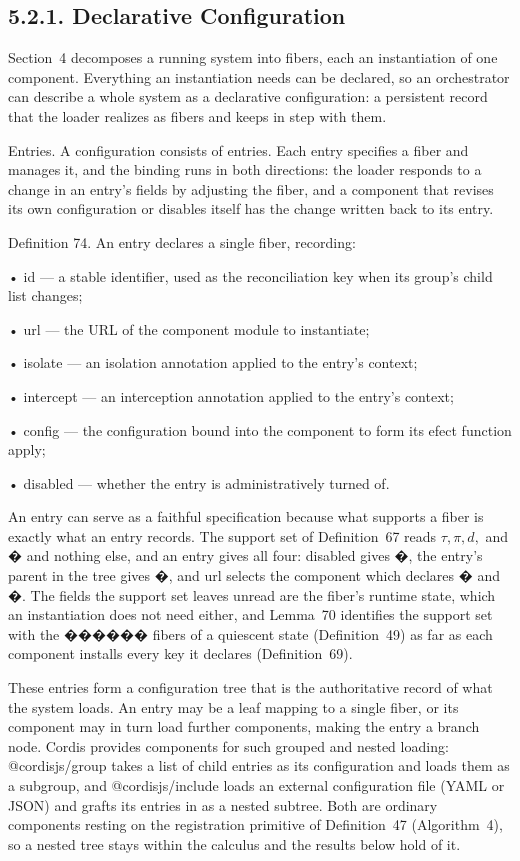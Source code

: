 \documentclass[
  10
]{article}
\begin{document}
\subsection{5.2.1. Declarative
Configuration}\label{declarative-configuration}

Section~4 decomposes a running system into fibers, each an instantiation
of one component. Everything an instantiation needs can be declared, so
an orchestrator can describe a whole system as a declarative
configuration: a persistent record that the loader realizes as fibers
and keeps in step with them.

Entries. A configuration consists of entries. Each entry specifies a
fiber and manages it, and the binding runs in both directions: the
loader responds to a change in an entry's fields by adjusting the fiber,
and a component that revises its own configuration or disables itself
has the change written back to its entry.

Definition 74. An entry declares a single fiber, recording:

• id --- a stable identifier, used as the reconciliation key when its
group's child list changes;

• url --- the URL of the component module to instantiate;

• isolate --- an isolation annotation applied to the entry's context;

• intercept --- an interception annotation applied to the entry's
context;

• config --- the configuration bound into the component to form its
efect function apply;

• disabled --- whether the entry is administratively turned of.

An entry can serve as a faithful specification because what supports a
fiber is exactly what an entry records. The support set of Definition~67
reads \(\tau , \pi , d ,\) and � and nothing else, and an entry gives
all four: disabled gives �, the entry's parent in the tree gives �, and
url selects the component which declares � and �. The fields the support
set leaves unread are the fiber's runtime state, which an instantiation
does not need either, and Lemma~70 identifies the support set with the
������ fibers of a quiescent state (Definition~49) as far as each
component installs every key it declares (Definition~69).

These entries form a configuration tree that is the authoritative record
of what the system loads. An entry may be a leaf mapping to a single
fiber, or its component may in turn load further components, making the
entry a branch node. Cordis provides components for such grouped and
nested loading: @cordisjs/group takes a list of child entries as its
configuration and loads them as a subgroup, and @cordisjs/include loads
an external configuration file (YAML or JSON) and grafts its entries in
as a nested subtree. Both are ordinary components resting on the
registration primitive of Definition~47 (Algorithm~4), so a nested tree
stays within the calculus and the results below hold of it.
\end{document}
